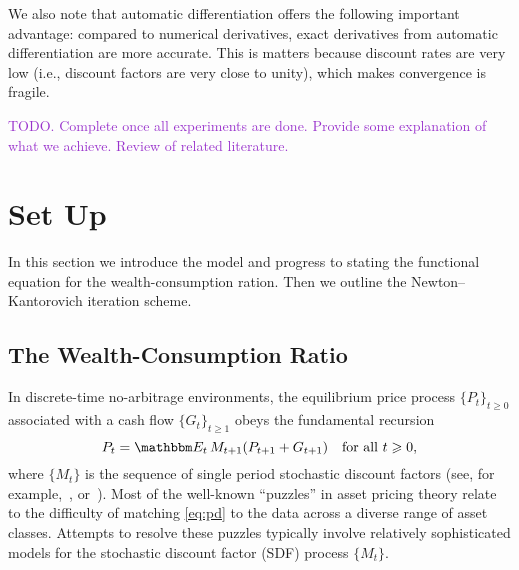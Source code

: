 \documentclass[12pt, reqno]{amsart}
\renewcommand{\geq}{\geqslant}
\newcommand{\1}{\mathbbm 1}
\newcommand{\EE}{\mathbbm E}
\theoremstyle{plain}
\theoremstyle{definition}
\begin{document}
We also note that automatic differentiation offers the following important
advantage: compared to numerical derivatives, exact derivatives from automatic
differentiation are more accurate.  This is matters because discount rates are
very low (i.e., discount factors are very close to unity), which makes
convergence is fragile.  


\textcolor{DarkOrchid}{TODO.  Complete once all experiments are done.  Provide
some explanation of what we achieve. Review of related literature.}




\section{Set Up}

In this section we introduce the model and progress to stating the
functional equation for the wealth-consumption ration.  Then we outline the
Newton--Kantorovich iteration scheme.

\subsection{The Wealth-Consumption Ratio}

In discrete-time no-arbitrage environments, the equilibrium price process
$\{P_t\}_{t \geq 0}$ associated with a cash flow $\{G_t\}_{t \geq 1}$ obeys
the fundamental recursion
%
\begin{equation}
    \label{eq:pd}
    P_t
    = \EE_t \, M_{t+1} ( P_{t+1} + G_{t+1} )
    \quad \text{for all } t \geq 0,
\end{equation}
%
where $\{ M_t\}$ is the sequence of single period stochastic discount factors
(see, for example,~\cite{kreps1981arbitrage}, \cite{hansen_richard:1987}
or~\cite{duffie2001dynamic}).  Most of the well-known ``puzzles'' in asset
pricing theory relate to the difficulty of matching \eqref{eq:pd} to the data
across a diverse range of asset classes. Attempts to resolve these puzzles
typically involve relatively sophisticated models for the stochastic discount
factor (SDF) process $\{ M_t\}$.
\end{document}
